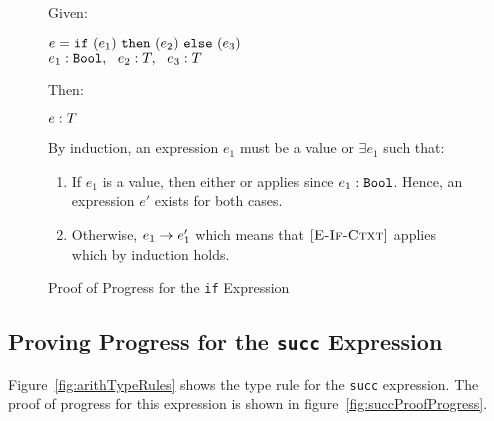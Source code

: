 \documentclass{report}
\newcommand{\rel}[1]{\mbox{\sc [#1]}}
\begin{document}
\begin{figure}[ht!]
Given:
\begin{center}
   $e = \mbox{\tt if}~({e_1})~\mbox{\tt then}~({e_2})~\mbox{\tt else}~({e_3})$\\
   ${e_1} : {\mbox{\tt Bool}},~~{e_2} : {T},~~{e_3} : {T}$
\end{center}
Then:
\begin{center}
   ${e} : {T}$
\end{center}
By induction, an expression $e_1$ must be a value or $\exists e_1$ such that:
\begin{enumerate}

    \item If $e_1$ is a value, then either \rel{E-If-True} or \rel{E-If-False} applies since ${e_1} : {\mbox{\tt Bool}}$.  Hence, an expression $e'$ exists for both cases.
      
    \item Otherwise, ${e_1} \rightarrow {e'_1}$ which means that $\rel{E-If-Ctxt}$ applies which by induction holds.
	
	\end{enumerate}
	
  \caption{Proof of Progress for the \texttt{if} Expression}\label{fig:ifProofProgress}
\end{figure}

\eject
\subsection{Proving Progress for the \texttt{succ} Expression}

Figure~\ref{fig:arithTypeRules} shows the type rule for the \texttt{succ} expression.  The proof of progress for this expression is shown in figure~\ref{fig:succProofProgress}.
\end{document}
